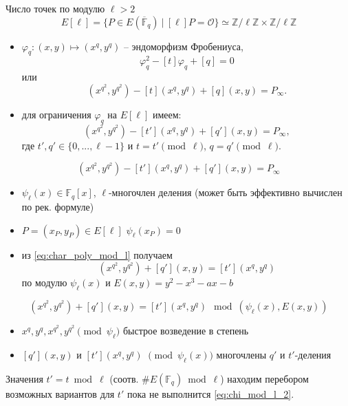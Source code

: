 \documentclass{beamer}
\begin{document}
\begin{frame}{Число точек по модулю $\ell > 2$}
\[
E[\ell] = \{P \in E(\overline{\mathbb{F}}_q)~|~[\ell] P = \mathcal{O}\} \simeq \mathbb{Z}/\ell\mathbb{Z} \times \mathbb{Z}/\ell \mathbb{Z}
\]
\begin{itemize}
    \item $\varphi_q: (x, y) \mapsto (x^q, y^q)$ -- эндоморфизм Фробениуса,
    \[
    \varphi_q^2 - [t] \varphi_q + [q] = 0
    \]
    или
    \[
    (x^{q^2}, y^{q^2}) - [t] (x^{q}, y^{q}) + [q](x,y) = P_\infty.
    \]
    \item для ограничения $\varphi_q$ на $E[\ell]$ имеем:
    \[
    (x^{q^2}, y^{q^2}) - [t'] (x^{q}, y^{q}) + [q'](x,y) = P_\infty,
    \]
    где $t', q' \in \{0, ..., \ell-1\}$ и $t = t' \pmod{\ell}$, $q = q' \pmod{\ell}$.
\end{itemize}
\end{frame}

\begin{frame}
\begin{equation}
    \label{eq:char_poly_mod_l}
(x^{q^2}, y^{q^2}) - [t'] (x^{q}, y^{q}) + [q'](x,y) = P_\infty
\end{equation}
\begin{itemize}
    \item $\psi_\ell(x) \in \mathbb{F}_q[x]$, $\ell$-многочлен деления (может быть эффективно вычислен по рек. формуле)
    \item $P = (x_P, y_P) \in E[\ell]$ \structure{$\iff$} $\psi_\ell(x_P) = 0$
    \item из \eqref{eq:char_poly_mod_l} получаем
    \[(x^{q^2}, y^{q^2}) + [q'](x,y) = [t'] (x^{q}, y^{q})\]
    по модулю $\psi_\ell(x)$ и $E(x,y) = y^2 - x^3 - a x - b$
\end{itemize}
\end{frame}

\begin{frame}
    \begin{equation}
    \label{eq:chi_mod_l_2}
    (x^{q^2}, y^{q^2}) + [q'](x,y) = [t'] (x^{q}, y^{q}) 
    ~\bmod (\psi_\ell(x), E(x,y))
    \end{equation}
    \begin{itemize}
        \item $x^q, y^q, x^{q^2}, y^{q^2} \pmod{\psi_\ell} $ \structure{$\implies$} быстрое возведение в степень
        \item $[q'](x,y)$ и $[t'](x^q, y^q)$ $\pmod{\psi_\ell(x)}$ \structure{$\implies$} многочлены $q'$ и $t'$-деления
    \end{itemize}
    \vspace{1em}
    Значения $t' = t\bmod{\ell}$ (соотв. $\#E(\mathbb{F}_q)\bmod{\ell}$) находим перебором возможных вариантов для $t'$ пока не выполнится \eqref{eq:chi_mod_l_2}.
\end{frame}
\end{document}
